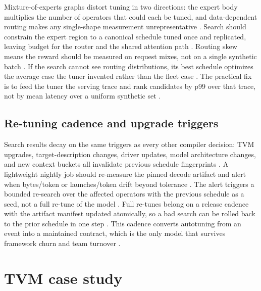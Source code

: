 Mixture-of-experts graphs distort tuning in two directions: the expert body multiplies the number of operators that could each be tuned, and data-dependent routing makes any single-shape measurement unrepresentative \citep{liu2024deepseekv3,kwon2023vllm}. Search should constrain the expert region to a canonical schedule tuned once and replicated, leaving budget for the router and the shared attention path \citep{patel2025llminference,chen2018tvm}. Routing skew means the reward should be measured on request mixes, not on a single synthetic batch \citep{taxbreak2026,liu2024deepseekv3}. If the search cannot see routing distributions, its best schedule optimizes the average case the tuner invented rather than the fleet case \citep{memoryfloor2026,patel2025llminference}. The practical fix is to feed the tuner the serving trace and rank candidates by p99 over that trace, not by mean latency over a uniform synthetic set \citep{kwon2023vllm,patel2025llminference}.

\subsection{Re-tuning cadence and upgrade triggers}

Search results decay on the same triggers as every other compiler decision: TVM upgrades, target-description changes, driver updates, model architecture changes, and new context buckets all invalidate previous schedule fingerprints \citep{chen2018tvm,memoryfloor2026,patel2025llminference}. A lightweight nightly job should re-measure the pinned decode artifact and alert when bytes/token or launches/token drift beyond tolerance \citep{taxbreak2026,chen2020compilerbasedhardw}. The alert triggers a bounded re-search over the affected operators with the previous schedule as a seed, not a full re-tune of the model \citep{zheng2020ansor,chen2018autotvm}. Full re-tunes belong on a release cadence with the artifact manifest updated atomically, so a bad search can be rolled back to the prior schedule in one step \citep{memoryfloor2026,yirage2026}. This cadence converts autotuning from an event into a maintained contract, which is the only model that survives framework churn and team turnover \citep{patel2025llminference,memoryfloor2026}.

\section{TVM case study}
\label{sec:ch16_tvm_case_study}

